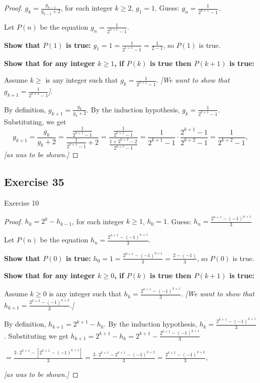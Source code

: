 \documentclass[14pt]{extarticle}
\newcommand{\dps}{\displaystyle}
\begin{document}
\begin{proof}
\(g_k = \dps \frac{g_{k-1}}{g_{k-1} + 2}\), for each integer \(k \geq 2\), \(g_1 = 1\). 
Guess: \(\dps g_n = \frac{1}{2^{n+1} - 1}\).

Let $P(n)$ be the equation \(\dps g_n = \frac{1}{2^{n+1} - 1}\).

{\bf Show that \(P(1)\) is true:} \(\dps g_1 = 1 = \frac{1}{2^{1+1} - 1} = \frac{1}{2-1}\), so $P(1)$ is true.

{\bf Show that for any integer \(k \geq 1\), if \(P(k)\) is true then \(P(k+1)\) is true:}

Assume \(k \geq \) is any integer such that \(\dps g_k = \frac{1}{2^{k+1} - 1}\). 
{\it [We want to show that \(\dps g_{k+1} = \frac{1}{2^{k+2} - 1}\)]}.

By definition, \(g_{k+1} = \dps \frac{g_k}{g_k + 2}\).
By the induction hypothesis, \(\dps g_k = \frac{1}{2^{k+1} - 1}\).
Substituting, we get
\[
g_{k+1} = \frac{g_k}{g_k + 2} = \frac{\frac{1}{2^{k+1} - 1}}{\frac{1}{2^{k+1} - 1} + 2} 
= \frac{\frac{1}{2^{k+1} - 1}}{\frac{1 + 2^{k+2} - 2}{2^{k+1} - 1}}
= \frac{1}{2^{k+1} - 1} \cdot \frac{2^{k+1} - 1}{2^{k+2} - 1} = \frac{1}{2^{k+2} - 1},
\]
{\it [as was to be shown.]}
\end{proof}

\subsection{Exercise 35}
Exercise 10

\begin{proof}
\(h_k = 2^k - h_{k-1}\), for each integer \(k \geq 1\), \(h_0 = 1\). 
Guess: \(\dps h_n = \frac{2^{n+1} - (-1)^{n+1}}{3}\)

Let $P(n)$ be the equation \(\dps h_n = \frac{2^{n+1} - (-1)^{n+1}}{3}\).

{\bf Show that \(P(0)\) is true:} \(h_0 = 1 = \frac{2^{0+1} - (-1)^{0+1}}{3} = \frac{2 -(-1)}{3}\), so $P(0)$ is true.

{\bf Show that for any integer \(k \geq 0\), if \(P(k)\) is true then \(P(k+1)\) is true:}

Assume \(k \geq 0\) is any integer such that \(\dps h_k = \frac{2^{k+1} - (-1)^{k+1}}{3}\). 
{\it [We want to show that \(\dps h_{k+1} = \frac{2^{k+2} - (-1)^{k+2}}{3}\).]}

By definition, \(h_{k+1} = 2^{k+1} - h_k\).
By the induction hypothesis, \(\dps h_k = \frac{2^{k+1} - (-1)^{k+1}}{3}\).
Substituting we get \(h_{k+1} = 2^{k+1} - h_k = \dps 2^{k+1} - \frac{2^{k+1} - (-1)^{k+1}}{3}\)

\(\dps = \frac{3 \cdot 2^{k+1} - [2^{k+1} - (-1)^{k+1}]}{3} =  \frac{3 \cdot 2^{k+1} - 2^{k+1} - (-1)^{k+2}}{3} = 
\frac{2^{k+1} - (-1)^{k+2}}{3}\), 

{\it [as was to be shown.]}
\end{proof}
\end{document}
